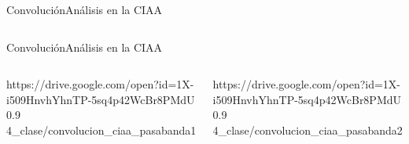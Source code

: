 \begin{frame}[c]{Convolución}{Análisis en la CIAA}
   \protoboardicon
   \begin{columns}[c]
      \hspace{2pt}
      \begin{column}{.5\textwidth}
         
      \end{column}
      \hspace{2pt}
      \vrule
      \hspace{2pt}
      \begin{column}{.5\textwidth}
         
      \end{column}
   \end{columns}
   \vfill
\end{frame}
\begin{frame}[c]{Convolución}{Análisis en la CIAA}
   \protoboardicon
   \begin{columns}[c]
      \hspace{2pt}
      \begin{column}{.5\textwidth}
         {https://drive.google.com/open?id=1X-i509HnvhYhnTP-5sq4p42WcBr8PMdU}
         {0.9}
         {4_clase/convolucion_ciaa_pasabanda1}
      \end{column}
      \hspace{2pt}
      \vrule
      \hspace{2pt}
      \begin{column}{.5\textwidth}
         {https://drive.google.com/open?id=1X-i509HnvhYhnTP-5sq4p42WcBr8PMdU}
         {0.9}
         {4_clase/convolucion_ciaa_pasabanda2}
      \end{column}
   \end{columns}
   \vfill
\end{frame}
